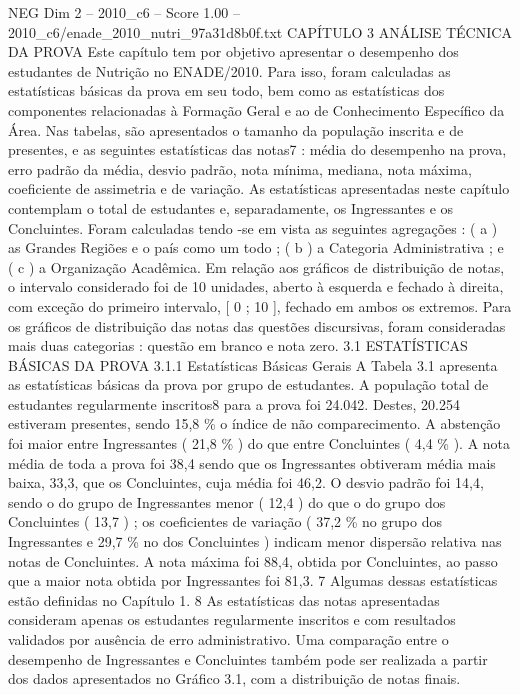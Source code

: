 \begin{textsample}{NEG Dim 2 – 2010\_c6 – Score 1.00 – 2010\_c6/enade\_2010\_nutri\_97a31d8b0f.txt}  \label{ex:f2_neg_252}
CAPÍTULO 3 ANÁLISE TÉCNICA DA PROVA Este capítulo tem por objetivo apresentar o desempenho dos estudantes de Nutrição no ENADE/2010.
Para isso, foram calculadas as estatísticas básicas da prova em seu todo, bem como as estatísticas dos componentes relacionadas à Formação Geral e ao de Conhecimento Específico da Área.
Nas tabelas, são apresentados o tamanho da população inscrita e de presentes, e as seguintes estatísticas das notas7 : média do desempenho na prova, erro padrão da média, desvio padrão, nota mínima, mediana, nota máxima, coeficiente de assimetria e de variação.
As estatísticas apresentadas neste capítulo contemplam o total de estudantes e, separadamente, os Ingressantes e os Concluintes.
Foram calculadas tendo -se em vista as seguintes agregações : ( a ) as Grandes Regiões e o país como um todo ; ( b ) a Categoria Administrativa ; e ( c ) a Organização Acadêmica.
Em relação aos gráficos de distribuição de notas, o intervalo considerado foi de 10 unidades, aberto à esquerda e fechado à direita, com exceção do primeiro intervalo, [ 0 ; 10 ], fechado em ambos os extremos.
Para os gráficos de distribuição das notas das questões discursivas, foram consideradas mais duas categorias : questão em branco e nota zero. 3.1 ESTATÍSTICAS BÁSICAS DA PROVA 3.1.1 Estatísticas Básicas Gerais A Tabela 3.1 apresenta as estatísticas básicas da prova por grupo de estudantes.
A população total de estudantes regularmente inscritos8 para a prova foi 24.042.
Destes, 20.254 estiveram presentes, sendo 15,8 \% o índice de não comparecimento.
A abstenção foi maior entre Ingressantes ( 21,8 \% ) do que entre Concluintes ( 4,4 \% ).
A nota média de toda a prova foi 38,4 sendo que os Ingressantes obtiveram média mais baixa, 33,3, que os Concluintes, cuja média foi 46,2.
O desvio padrão foi 14,4, sendo o do grupo de Ingressantes menor ( 12,4 ) do que o do grupo dos Concluintes ( 13,7 ) ; os coeficientes de variação ( 37,2 \% no grupo dos Ingressantes e 29,7 \% no dos Concluintes ) indicam menor dispersão relativa nas notas de Concluintes.
A nota máxima foi 88,4, obtida por Concluintes, ao passo que a maior nota obtida por Ingressantes foi 81,3. 7 Algumas dessas estatísticas estão definidas no Capítulo 1. 8 As estatísticas das notas apresentadas consideram apenas os estudantes regularmente inscritos e com resultados validados por ausência de erro administrativo.
Uma comparação entre o desempenho de Ingressantes e Concluintes também pode ser realizada a partir dos dados apresentados no Gráfico 3.1, com a distribuição de notas finais.

\end{textsample}
